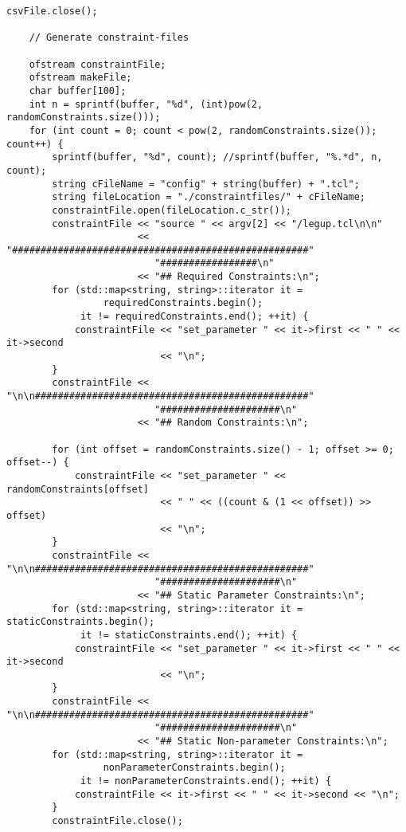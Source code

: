 \begin{lstlisting}[caption={Constraint-generation program source code}label=lst:constraintGenerating]
    csvFile.close();

    // Generate constraint-files

    ofstream constraintFile;
    ofstream makeFile;
    char buffer[100];
    int n = sprintf(buffer, "%d", (int)pow(2, randomConstraints.size()));
    for (int count = 0; count < pow(2, randomConstraints.size()); count++) {
        sprintf(buffer, "%d", count); //sprintf(buffer, "%.*d", n, count);
        string cFileName = "config" + string(buffer) + ".tcl";
        string fileLocation = "./constraintfiles/" + cFileName;
        constraintFile.open(fileLocation.c_str());
        constraintFile << "source " << argv[2] << "/legup.tcl\n\n"
                       << "####################################################"
                          "#################\n"
                       << "## Required Constraints:\n";
        for (std::map<string, string>::iterator it =
                 requiredConstraints.begin();
             it != requiredConstraints.end(); ++it) {
            constraintFile << "set_parameter " << it->first << " " << it->second
                           << "\n";
        }
        constraintFile << "\n\n################################################"
                          "#####################\n"
                       << "## Random Constraints:\n";

        for (int offset = randomConstraints.size() - 1; offset >= 0; offset--) {
            constraintFile << "set_parameter " << randomConstraints[offset]
                           << " " << ((count & (1 << offset)) >> offset)
                           << "\n";
        }
        constraintFile << "\n\n################################################"
                          "#####################\n"
                       << "## Static Parameter Constraints:\n";
        for (std::map<string, string>::iterator it = staticConstraints.begin();
             it != staticConstraints.end(); ++it) {
            constraintFile << "set_parameter " << it->first << " " << it->second
                           << "\n";
        }
        constraintFile << "\n\n################################################"
                          "#####################\n"
                       << "## Static Non-parameter Constraints:\n";
        for (std::map<string, string>::iterator it =
                 nonParameterConstraints.begin();
             it != nonParameterConstraints.end(); ++it) {
            constraintFile << it->first << " " << it->second << "\n";
        }
        constraintFile.close();


\end{lstlisting}
